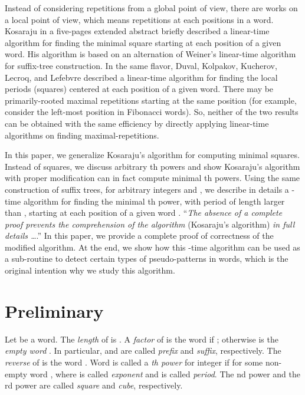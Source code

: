 \documentclass{article}
\begin{document}
Instead of considering repetitions from a global point of view,
there are works on a local point of view, which means repetitions at
each positions in a word. Kosaraju in a five-pages extended abstract
\cite{Kosaraju1994} briefly described a linear-time algorithm for
finding the minimal square starting at each position of a given
word. His algorithm is based on an alternation of Weiner's
linear-time algorithm for suffix-tree construction. In the same
flavor, Duval, Kolpakov, Kucherov, Lecroq, and Lefebvre
\cite{Duval&Kolpakov&Kucherov&Lecroq&Lefebvre2004} described a
linear-time algorithm for finding the local periods (squares)
centered at each position of a given word. There may be  primarily-rooted maximal repetitions starting at the same
position (for example, consider the left-most position in Fibonacci
words). So, neither of the two results can be obtained with the same
efficiency by directly applying linear-time algorithms on finding
maximal-repetitions.


In this paper, we generalize Kosaraju's algorithm
\cite{Kosaraju1994} for computing minimal squares. Instead of
squares, we discuss arbitrary th powers and show Kosaraju's
algorithm with proper modification can in fact compute minimal th
powers. Using the same construction of suffix trees, for arbitrary
integers  and , we describe in details a
-time algorithm for finding the minimal th power,
with period of length larger than , starting at each position of
a given word . ``\emph{The absence of a complete proof prevents
the comprehension of the algorithm} (Kosaraju's algorithm) \emph{in
full details
\ldots}.''\cite{Duval&Kolpakov&Kucherov&Lecroq&Lefebvre2004} In this
paper, we provide a complete proof of correctness of the modified
algorithm. At the end, we show how this -time algorithm
can be used as a sub-routine to detect certain types of
pseudo-patterns in words, which is the original intention why we
study this algorithm.


\section{Preliminary}
Let  be a word. The \emph{length}  of
 is . A \emph{factor}  of  is the word
 if ; otherwise
 is the \emph{empty word} . In particular,
 and  are called \emph{prefix} and
\emph{suffix}, respectively. The \emph{reverse} of  is the word
. Word  is called a \emph{th power} for
integer  if  for some non-empty word , where 
is called \emph{exponent} and  is called \emph{period}. The nd
power and the rd power are called \emph{square} and \emph{cube},
respectively.
\end{document}
